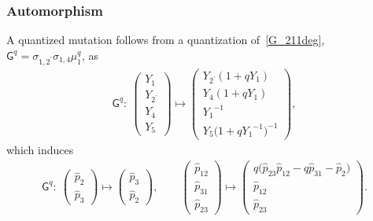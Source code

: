 \documentclass[10pt,a4paper]{amsart}
\numberwithin{equation}{section}
\begin{document}
\subsubsection*{Automorphism}
A quantized mutation follows from a quantization of~\eqref{G_211deg}, $\mathsf{G}^q=\sigma_{1,2^\prime} \sigma_{1,4} \mu^q_1$, as
\begin{gather*}
 \mathsf{G}^q\colon \
 \begin{pmatrix}
 Y_1 \\ Y_{2^\prime} \\ Y_4 \\ Y_5
 \end{pmatrix}
 \mapsto
 \begin{pmatrix}
 Y_{2^\prime} ( 1 + q Y_1) \\
 Y_4 ( 1 + q Y_1) \\
 {Y_1}^{-1} \\
 Y_5 \big( 1 + q {Y_1}^{-1} \big)^{-1}
 \end{pmatrix} ,
\end{gather*}
which induces
\begin{gather*}
 \mathsf{G}^q \colon \
 \begin{pmatrix}
 \hat{p}_2 \\
 \hat{p}_3
 \end{pmatrix}
 \mapsto
 \begin{pmatrix}
 \hat{p}_3 \\
 \hat{p}_2
 \end{pmatrix} , \qquad
 \begin{pmatrix}
 \hat{p}_{12} \\
 \hat{p}_{31} \\
 \hat{p}_{23}
 \end{pmatrix}
 \mapsto
 \begin{pmatrix}
 q \big( \hat{p}_{23} \hat{p}_{12} - q \hat{p}_{31} -\hat{p}_2 \big) \\
 \hat{p}_{12} \\
 \hat{p}_{23}
 \end{pmatrix} .
\end{gather*}
\end{document}
